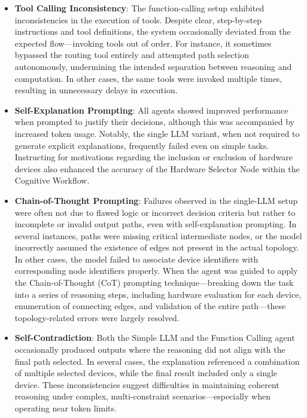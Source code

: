 \begin{itemize}[leftmargin=*, label=--]
\item \textbf{Tool Calling Inconsistency}: The function-calling setup exhibited inconsistencies in the execution of tools. Despite clear, step-by-step instructions and tool definitions, the system occasionally deviated from the expected flow—invoking tools out of order. For instance, it sometimes bypassed the routing tool entirely and attempted path selection autonomously, undermining the intended separation between reasoning and computation. In other cases, the same tools were invoked multiple times, resulting in unnecessary delays in execution.

\item \textbf{Self-Explanation Prompting}: All agents showed improved performance when prompted to justify their decisions, although this was accompanied by increased token usage. Notably, the single LLM variant, when not required to generate explicit explanations, frequently failed even on simple tasks. Instructing for motivations regarding the inclusion or exclusion of hardware devices also enhanced the accuracy of the Hardware Selector Node within the Cognitive Workflow.

\item \textbf{Chain-of-Thought Prompting}: Failures observed in the single-LLM setup were often not due to flawed logic or incorrect decision criteria but rather to incomplete or invalid output paths, even with self-explanation prompting. In several instances, paths were missing critical intermediate nodes, or the model incorrectly assumed the existence of edges not present in the actual topology. In other cases, the model failed to associate device identifiers with corresponding node identifiers properly. When the agent was guided to apply the Chain-of-Thought (CoT) prompting technique—breaking down the task into a series of reasoning steps, including hardware evaluation for each device, enumeration of connecting edges, and validation of the entire path—these topology-related errors were largely resolved. 

\item \textbf{Self-Contradiction}: Both the Simple LLM and the Function Calling agent occasionally produced outputs where the reasoning did not align with the final path selected. In several cases, the explanation referenced a combination of multiple selected devices, while the final result included only a single device. These inconsistencies suggest difficulties in maintaining coherent reasoning under complex, multi-constraint scenarios—especially when operating near token limits.


\end{itemize}


